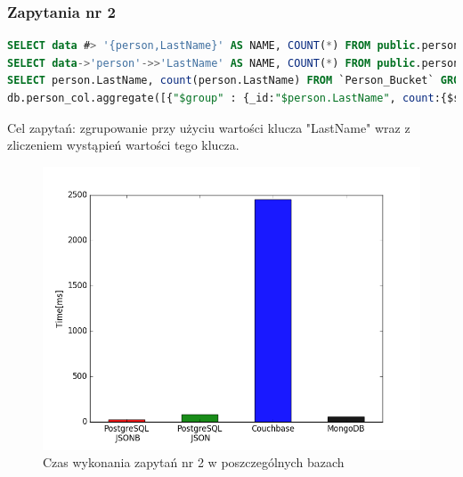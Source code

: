 \documentclass[a4paper,12pt,table]{article}
\begin{document}
{\subsubsection{Zapytania nr 2}
\begin{lstlisting}[language=SQL,basicstyle=\footnotesize]
SELECT data #> '{person,LastName}' AS NAME, COUNT(*) FROM public.personjsonb GROUP BY NAME;
SELECT data->'person'->>'LastName' AS NAME, COUNT(*) FROM public.personjson GROUP BY NAME;
SELECT person.LastName, count(person.LastName) FROM `Person_Bucket` GROUP BY person.LastName;
db.person_col.aggregate([{"$group" : {_id:"$person.LastName", count:{$sum:1}}}]);
\end{lstlisting}
\vspace{0.5cm}
Cel zapytań: zgrupowanie przy użyciu wartości klucza "LastName" wraz z zliczeniem wystąpień wartości tego klucza.
\begin{figure}[h]
\begin{center}
\includegraphics[scale=0.5]{ax/fig2}
\end{center}
\caption{Czas wykonania zapytań nr 2 w poszczególnych bazach}
\end{figure}
\newpage
}
\end{document}
